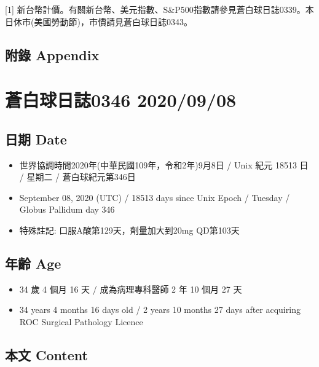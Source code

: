\documentclass[
]{article}
\providecommand{\tightlist}{%
  \setlength{\itemsep}{0pt}\setlength{\parskip}{0pt}}
\begin{document}
{[}1{]}
新台幣計價。有關新台幣、美元指數、S\&P500指數請參見蒼白球日誌0339。本日休市(美國勞動節)，市價請見蒼白球日誌0343。

\hypertarget{ux9644ux9304-appendix-6}{%
\subsection{附錄 Appendix}\label{ux9644ux9304-appendix-6}}

\hypertarget{ux84bcux767dux7403ux65e5ux8a8c0346-20200908}{%
\section{蒼白球日誌0346
2020/09/08}\label{ux84bcux767dux7403ux65e5ux8a8c0346-20200908}}

\hypertarget{ux65e5ux671f-date-7}{%
\subsection{日期 Date}\label{ux65e5ux671f-date-7}}

\begin{itemize}
\tightlist
\item
  世界協調時間2020年(中華民國109年，令和2年)9月8日 / Unix 紀元 18513 日
  / 星期二 / 蒼白球紀元第346日
\item
  September 08, 2020 (UTC) / 18513 days since Unix Epoch / Tuesday /
  Globus Pallidum day 346
\item
  特殊註記: 口服A酸第129天，劑量加大到20mg QD第103天
\end{itemize}

\hypertarget{ux5e74ux9f61-age-7}{%
\subsection{年齡 Age}\label{ux5e74ux9f61-age-7}}

\begin{itemize}
\tightlist
\item
  34 歲 4 個月 16 天 / 成為病理專科醫師 2 年 10 個月 27 天
\item
  34 years 4 months 16 days old / 2 years 10 months 27 days after
  acquiring ROC Surgical Pathology Licence
\end{itemize}

\hypertarget{ux672cux6587-content-7}{%
\subsection{本文 Content}\label{ux672cux6587-content-7}}
\end{document}
